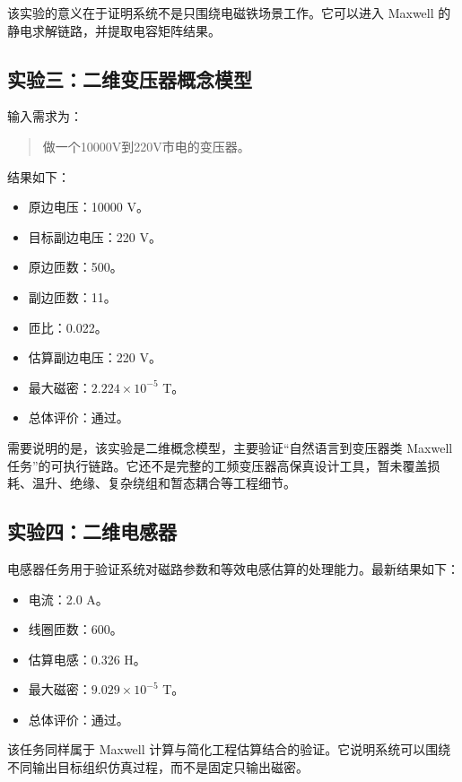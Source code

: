 \documentclass[12pt,a4paper]{ctexart}
\begin{document}
该实验的意义在于证明系统不是只围绕电磁铁场景工作。它可以进入 Maxwell 的静电求解链路，并提取电容矩阵结果。

\subsection{实验三：二维变压器概念模型}

输入需求为：

\begin{quote}
做一个10000V到220V市电的变压器。
\end{quote}

结果如下：

\begin{itemize}
  \item 原边电压：10000 V。
  \item 目标副边电压：220 V。
  \item 原边匝数：500。
  \item 副边匝数：11。
  \item 匝比：0.022。
  \item 估算副边电压：220 V。
  \item 最大磁密：$2.224\times 10^{-5}$ T。
  \item 总体评价：通过。
\end{itemize}

需要说明的是，该实验是二维概念模型，主要验证“自然语言到变压器类 Maxwell 任务”的可执行链路。它还不是完整的工频变压器高保真设计工具，暂未覆盖损耗、温升、绝缘、复杂绕组和暂态耦合等工程细节。

\subsection{实验四：二维电感器}

电感器任务用于验证系统对磁路参数和等效电感估算的处理能力。最新结果如下：

\begin{itemize}
  \item 电流：2.0 A。
  \item 线圈匝数：600。
  \item 估算电感：0.326 H。
  \item 最大磁密：$9.029\times 10^{-5}$ T。
  \item 总体评价：通过。
\end{itemize}

该任务同样属于 Maxwell 计算与简化工程估算结合的验证。它说明系统可以围绕不同输出目标组织仿真过程，而不是固定只输出磁密。
\end{document}
